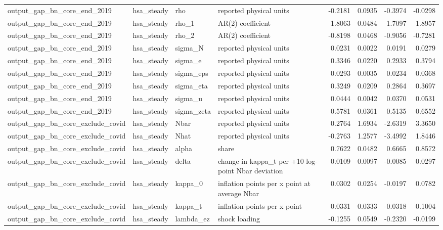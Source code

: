 \begin{tabular}{llllrrrr}
output\_gap\_bn\_core\_end\_2019 & hsa\_steady & rho & reported physical units & -0.2181 & 0.0935 & -0.3974 & -0.0298 \\
output\_gap\_bn\_core\_end\_2019 & hsa\_steady & rho\_1 & AR(2) coefficient & 1.8063 & 0.0484 & 1.7097 & 1.8957 \\
output\_gap\_bn\_core\_end\_2019 & hsa\_steady & rho\_2 & AR(2) coefficient & -0.8198 & 0.0468 & -0.9056 & -0.7281 \\
output\_gap\_bn\_core\_end\_2019 & hsa\_steady & sigma\_N & reported physical units & 0.0231 & 0.0022 & 0.0191 & 0.0279 \\
output\_gap\_bn\_core\_end\_2019 & hsa\_steady & sigma\_e & reported physical units & 0.3346 & 0.0220 & 0.2933 & 0.3794 \\
output\_gap\_bn\_core\_end\_2019 & hsa\_steady & sigma\_eps & reported physical units & 0.0293 & 0.0035 & 0.0234 & 0.0368 \\
output\_gap\_bn\_core\_end\_2019 & hsa\_steady & sigma\_eta & reported physical units & 0.3249 & 0.0209 & 0.2864 & 0.3697 \\
output\_gap\_bn\_core\_end\_2019 & hsa\_steady & sigma\_u & reported physical units & 0.0444 & 0.0042 & 0.0370 & 0.0531 \\
output\_gap\_bn\_core\_end\_2019 & hsa\_steady & sigma\_zeta & reported physical units & 0.5781 & 0.0361 & 0.5135 & 0.6552 \\
output\_gap\_bn\_core\_exclude\_covid & hsa\_steady & Nbar & reported physical units & 0.2764 & 1.6934 & -2.6319 & 3.3650 \\
output\_gap\_bn\_core\_exclude\_covid & hsa\_steady & Nhat & reported physical units & -0.2763 & 1.2577 & -3.4992 & 1.8446 \\
output\_gap\_bn\_core\_exclude\_covid & hsa\_steady & alpha & share & 0.7622 & 0.0482 & 0.6665 & 0.8572 \\
output\_gap\_bn\_core\_exclude\_covid & hsa\_steady & delta & change in kappa\_t per +10 log-point Nbar deviation & 0.0109 & 0.0097 & -0.0085 & 0.0297 \\
output\_gap\_bn\_core\_exclude\_covid & hsa\_steady & kappa\_0 & inflation points per x point at average Nbar & 0.0302 & 0.0254 & -0.0197 & 0.0782 \\
output\_gap\_bn\_core\_exclude\_covid & hsa\_steady & kappa\_t & inflation points per x point & 0.0331 & 0.0333 & -0.0318 & 0.1004 \\
output\_gap\_bn\_core\_exclude\_covid & hsa\_steady & lambda\_ez & shock loading & -0.1255 & 0.0549 & -0.2320 & -0.0199 \\

\end{tabular}
